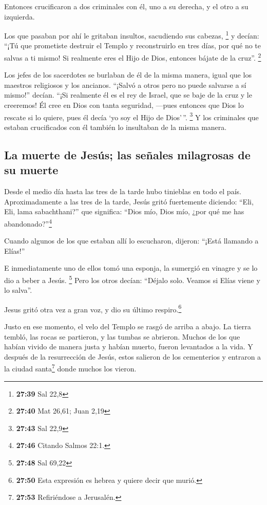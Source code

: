  Entonces crucificaron a dos criminales con él, uno a su
derecha, y el otro a su izquierda.

 Los que pasaban por ahí le gritaban insultos, sacudiendo
sus cabezas, \footnote{\textbf{27:39} Sal 22,8}  y
decían: ``¡Tú que prometiste destruir el Templo y reconstruirlo en tres
días, por qué no te salvas a ti mismo! Si realmente eres el Hijo de
Dios, entonces bájate de la cruz''. \footnote{\textbf{27:40} Mat 26,61;
  Juan 2,19}

 Los jefes de los sacerdotes se burlaban de él de la
misma manera, igual que los maestros religiosos y los ancianos.
 ``¡Salvó a otros pero no puede salvarse a sí mismo!''
decían. ``¡Si realmente él es el rey de Israel, que se baje de la cruz y
le creeremos!  Él cree en Dios con tanta seguridad,
---pues entonces que Dios lo rescate si lo quiere, pues él decía `yo soy
el Hijo de Dios'\,''. \footnote{\textbf{27:43} Sal 22,9} 
Y los criminales que estaban crucificados con él también lo insultaban
de la misma manera.

\hypertarget{la-muerte-de-jesuxfas-las-seuxf1ales-milagrosas-de-su-muerte}{%
\subsection{La muerte de Jesús; las señales milagrosas de su
muerte}\label{la-muerte-de-jesuxfas-las-seuxf1ales-milagrosas-de-su-muerte}}

 Desde el medio día hasta las tres de la tarde hubo
tinieblas en todo el país.  Aproximadamente a las tres de
la tarde, Jesús gritó fuertemente diciendo: ``Eli, Eli, lama
sabachthani?'' que significa: ``Dios mío, Dios mío, ¿por qué me has
abandonado?''\footnote{\textbf{27:46} Citando Salmos 22:1.}

 Cuando algunos de los que estaban allí lo escucharon,
dijeron: ``¡Está llamando a Elías!''

 E inmediatamente uno de ellos tomó una esponja, la
sumergió en vinagre y se lo dio a beber a Jesús. \footnote{\textbf{27:48}
  Sal 69,22}  Pero los otros decían: ``Déjalo solo.
Veamos si Elías viene y lo salva''.

 Jesus gritó otra vez a gran voz, y dio su último
respiro.\footnote{\textbf{27:50} Esta expresión es hebrea y quiere decir
  que murió.}

 Justo en ese momento, el velo del Templo se rasgó de
arriba a abajo. La tierra tembló, las rocas se partieron,
 y las tumbas se abrieron. Muchos de los que habían
vivido de manera justa y habían muerto, fueron levantados a la vida.
 Y después de la resurrección de Jesús, estos salieron de
los cementerios y entraron a la ciudad santa\footnote{\textbf{27:53}
  Refiriéndose a Jerusalén.} donde muchos los vieron.

